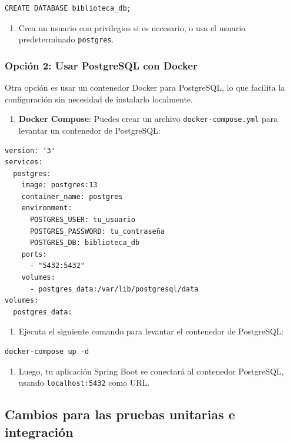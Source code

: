 \documentclass[11pt]{article}
\begin{document}
\begin{verbatim}
CREATE DATABASE biblioteca_db;
\end{verbatim}

\begin{enumerate}
\item Crea un usuario con privilegios si es necesario, o usa el usuario predeterminado \texttt{postgres}.
\end{enumerate}

\subsubsection{Opción 2: Usar PostgreSQL con Docker}
\label{sec:orga77d701}

Otra opción es usar un contenedor Docker para PostgreSQL, lo que facilita la configuración sin necesidad de instalarlo localmente.

\begin{enumerate}
\item \textbf{\textbf{Docker Compose}}: Puedes crear un archivo \texttt{docker-compose.yml} para levantar un contenedor de PostgreSQL:
\end{enumerate}

\begin{verbatim}
version: '3'
services:
  postgres:
    image: postgres:13
    container_name: postgres
    environment:
      POSTGRES_USER: tu_usuario
      POSTGRES_PASSWORD: tu_contraseña
      POSTGRES_DB: biblioteca_db
    ports:
      - "5432:5432"
    volumes:
      - postgres_data:/var/lib/postgresql/data
volumes:
  postgres_data:
\end{verbatim}

\begin{enumerate}
\item Ejecuta el siguiente comando para levantar el contenedor de PostgreSQL:
\end{enumerate}

\begin{verbatim}
docker-compose up -d
\end{verbatim}

\begin{enumerate}
\item Luego, tu aplicación Spring Boot se conectará al contenedor PostgreSQL, usando \texttt{localhost:5432} como URL.
\end{enumerate}

\subsection{Cambios para las pruebas unitarias e integración}
\label{sec:org8d4434e}
\end{document}
